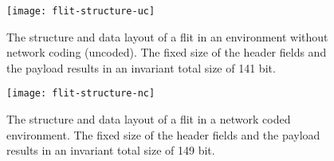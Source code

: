 \begin{figure}
    \centering
    \texttt{[image: flit-structure-uc]}
    \caption[The structure of a flit without network coding]{The structure and data layout of a flit in an environment without network coding
    (uncoded). The fixed size of the header fields and the payload results in an invariant total size of 141 bit.}
    \label{fig:flitstructureuncoded}
\end{figure}

\begin{figure}
    \centering
    \texttt{[image: flit-structure-nc]}
    \caption[The structure of a flit with network coding]{The structure and data layout of a flit in a network coded environment. The fixed size of
    the header fields and the payload results in an invariant total size of 149 bit.}
    \label{fig:flitstructurenetworkcoded}
\end{figure}

